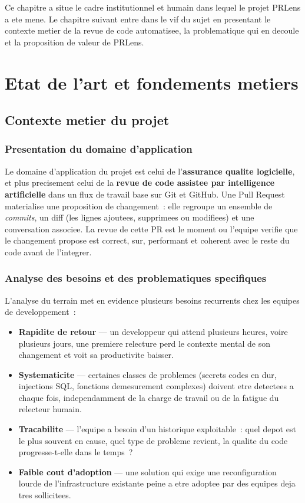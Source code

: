 \documentclass[a4paper,12pt,oneside]{report}
\begin{document}
Ce chapitre a situe le cadre institutionnel et humain dans lequel le projet PRLens a ete mene. Le chapitre suivant entre dans le vif du sujet en presentant le contexte metier de la revue de code automatisee, la problematique qui en decoule et la proposition de valeur de PRLens.

\chapter{Etat de l'art et fondements metiers}

\section{Contexte metier du projet}

\subsection{Presentation du domaine d'application}

Le domaine d'application du projet est celui de l'\textbf{assurance qualite logicielle}, et plus precisement celui de la \textbf{revue de code assistee par intelligence artificielle} dans un flux de travail base sur Git et GitHub. Une Pull Request materialise une proposition de changement~: elle regroupe un ensemble de \emph{commits}, un diff (les lignes ajoutees, supprimees ou modifiees) et une conversation associee. La revue de cette PR est le moment ou l'equipe verifie que le changement propose est correct, sur, performant et coherent avec le reste du code avant de l'integrer.

\subsection{Analyse des besoins et des problematiques specifiques}

L'analyse du terrain met en evidence plusieurs besoins recurrents chez les equipes de developpement~:

\begin{itemize}
  \item \textbf{Rapidite de retour} --- un developpeur qui attend plusieurs heures, voire plusieurs jours, une premiere relecture perd le contexte mental de son changement et voit sa productivite baisser.
  \item \textbf{Systematicite} --- certaines classes de problemes (secrets codes en dur, injections SQL, fonctions demesurement complexes) doivent etre detectees a chaque fois, independamment de la charge de travail ou de la fatigue du relecteur humain.
  \item \textbf{Tracabilite} --- l'equipe a besoin d'un historique exploitable~: quel depot est le plus souvent en cause, quel type de probleme revient, la qualite du code progresse-t-elle dans le temps~?
  \item \textbf{Faible cout d'adoption} --- une solution qui exige une reconfiguration lourde de l'infrastructure existante peine a etre adoptee par des equipes deja tres sollicitees.
\end{itemize}
\end{document}
